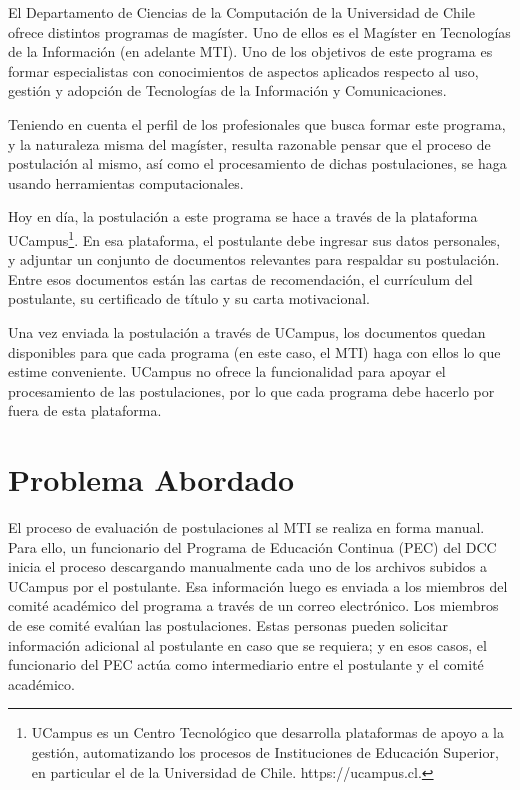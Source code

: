 \begin{intro}
	El Departamento de Ciencias de la Computación de la Universidad de Chile
	ofrece distintos programas de magíster. Uno de ellos es el Magíster en
	Tecnologías de la Información (en adelante MTI). Uno de los objetivos de
	este programa es formar especialistas con conocimientos de aspectos
	aplicados respecto al uso, gestión y adopción de Tecnologías de la
	Información y Comunicaciones.

	Teniendo en cuenta el perfil de los profesionales que busca formar este
	programa, y la naturaleza misma del magíster, resulta razonable pensar que
	el proceso de postulación al mismo, así como el procesamiento de dichas
	postulaciones, se haga usando herramientas computacionales.
	
	Hoy en día, la postulación a este programa se hace a través de la plataforma
	UCampus\footnote{UCampus es un Centro Tecnológico que desarrolla plataformas
	de apoyo a la gestión, automatizando los procesos de Instituciones de
	Educación Superior, en particular el de la Universidad de Chile.
	https://ucampus.cl.}. En esa plataforma, el postulante debe ingresar sus
	datos personales, y adjuntar un conjunto de documentos relevantes para
	respaldar su  postulación. Entre esos documentos están las cartas de
	recomendación, el currículum del postulante, su certificado de título y su
	carta motivacional.
	
	Una vez enviada la postulación a través de UCampus, los documentos quedan
	disponibles para que cada programa (en este caso, el MTI) haga con ellos lo
	que estime conveniente. UCampus no ofrece la funcionalidad para apoyar el
	procesamiento de las postulaciones, por lo que cada programa debe hacerlo
	por fuera de esta plataforma. 

	\section{Problema Abordado}

	El proceso de evaluación de postulaciones al MTI se realiza en forma manual.
	Para ello, un funcionario del Programa de Educación Continua (PEC) del DCC
	inicia el proceso descargando manualmente cada uno de los archivos subidos a
	UCampus por el postulante. Esa información luego es enviada a los miembros
	del comité académico del programa a través de un correo electrónico. Los
	miembros de ese comité evalúan las postulaciones. Estas personas pueden
	solicitar información adicional al postulante en caso que se requiera; y en
	esos casos, el funcionario del PEC actúa como intermediario entre el
	postulante y el comité académico.


\end{intro}

